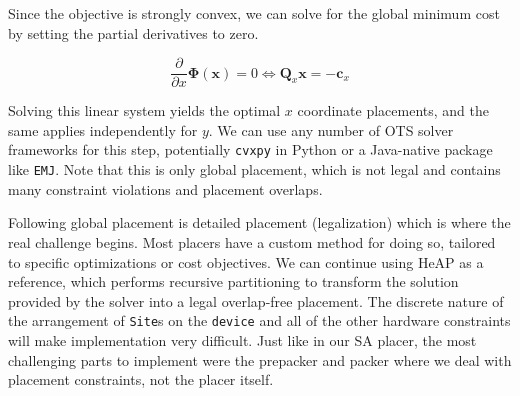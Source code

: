 Since the objective is strongly convex, we can solve for the global minimum cost by setting the partial derivatives to zero.

\begin{equation}
    \frac{\partial}{\partial x} \boldsymbol{\Phi} (\boldsymbol{x}) = 0 \Longleftrightarrow \boldsymbol{Q}_x \boldsymbol{x} = - \boldsymbol{c}_x
\end{equation}

Solving this linear system yields the optimal $x$ coordinate placements, and the same applies independently for $y$.
We can use any number of OTS solver frameworks for this step, potentially \texttt{cvxpy} in Python or a Java-native package like \texttt{EMJ}.
Note that this is only global placement, which is not legal and contains many constraint violations and placement overlaps.

Following global placement is detailed placement (legalization) which is where the real challenge begins.
Most placers have a custom method for doing so, tailored to specific optimizations or cost objectives.
We can continue using HeAP as a reference, which performs recursive partitioning to transform the solution provided by the solver into a legal overlap-free placement.
The discrete nature of the arrangement of \texttt{Site}s on the \texttt{device} and all of the other hardware constraints will make implementation very difficult.
Just like in our SA placer, the most challenging parts to implement were the prepacker and packer where we deal with placement constraints, not the placer itself.

